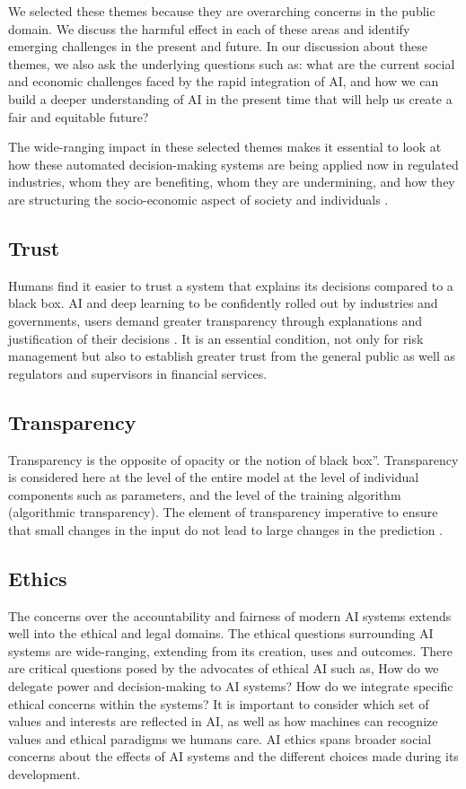 We selected these themes because they are overarching concerns in the public domain. We discuss the harmful effect in each of these areas and identify emerging challenges in the present and future. In our discussion about these themes, we also ask the underlying questions such as: what are the current social and economic challenges faced by the rapid integration of AI, and how we can build a deeper understanding of AI \cite{Solon2017} in the present time that will help us create a fair and equitable future?

The wide-ranging impact in these selected themes makes it essential to look at how these automated decision-making systems are being applied now in regulated industries, whom they are benefiting, whom they are undermining, and how they are structuring the socio-economic aspect of society and individuals \cite{ainow2016report}.

\subsection{Trust}

Humans find it easier to trust a system that explains its decisions compared to a black box. AI and deep learning to be confidently rolled out by industries and governments, users demand greater transparency through explanations and justification of their decisions \cite{molnar}. It is an essential condition, not only for risk management but also to establish greater trust from the general public as well as regulators and supervisors in financial services.


\subsection{Transparency}

Transparency is the opposite of opacity or the notion of black box”. Transparency is considered here at the level of the entire model at the level of individual components such as parameters, and the level of the training algorithm (algorithmic transparency). The element of transparency imperative to ensure that small changes in the input do not lead to large changes in the prediction \cite{molnar}.

\subsection{Ethics}

The concerns over the accountability and fairness of modern AI systems extends well into the ethical and legal domains. The ethical questions surrounding AI systems are wide-ranging, extending from its creation, uses and outcomes. There are critical questions posed by the advocates of ethical AI such as, How do we delegate power and decision-making to AI systems? \cite{ainow2016report} How do we integrate specific ethical concerns within the systems? It is important to consider which set of values and interests are reflected in AI, as well as how machines can recognize values and ethical paradigms we humans care. AI ethics spans broader social concerns about the effects of AI systems and the different choices made during its development.

